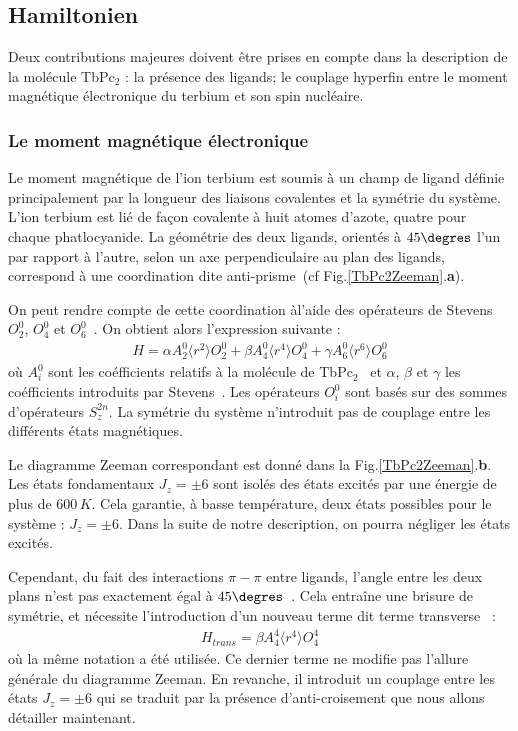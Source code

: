 \subsection{Hamiltonien}

Deux contributions majeures doivent être prises en compte dans la description de la molécule TbPc$_{2}$ : la présence des ligands; le couplage hyperfin entre le moment magnétique électronique du terbium et son spin nucléaire.

\subsubsection{Le moment magnétique électronique}
Le moment magnétique de l'ion terbium est soumis à un champ de ligand définie principalement par la longueur des liaisons covalentes et la symétrie du système. 
L'ion terbium est lié de façon covalente à huit atomes d'azote, quatre pour chaque phatlocyanide. La géométrie des deux ligands, orientés à $45\degres$ l'un par rapport à l'autre, selon un axe perpendiculaire au plan des ligands, correspond à une coordination dite anti-prisme~(cf Fig.\ref{TbPc2Zeeman}.\textbf{a}). 

On peut rendre compte de cette coordination àl'aide des opérateurs de Stevens $O_2^0$, $O_4^0$ et $O_6^0$~\cite{Stevens1952,Sorace2011}. On obtient alors l'expression suivante :
\begin{eqnarray}
H = \alpha A_2^0 \langle r^2 \rangle O_2^0 + \beta A_4^0 \langle r^4 \rangle O_4^0 + \gamma A_6^0 \langle r^6 \rangle O_6^0
\end{eqnarray}
où $A_i^0$ sont les coéfficients relatifs à la molécule de TbPc$_2$~\cite{Ishikawa2005} et $\alpha$, $\beta$ et $\gamma$ les coéfficients introduits par Stevens~\cite{Stevens1952}. Les opérateurs $O^0_i$ sont basés sur des sommes d'opérateurs $S_z^{2n}$. La symétrie du système n'introduit pas de couplage entre les différents états magnétiques. 

Le diagramme Zeeman correspondant est donné dans la Fig.\ref{TbPc2Zeeman}.\textbf{b}. Les états fondamentaux $J_z = \pm 6$ sont isolés des états excités par une énergie de plus de $600\,K$. Cela garantie, à basse température, deux états possibles pour le système : $J_z = \pm 6$. Dans la suite de notre description, on pourra négliger les états excités.

 
Cependant, du fait des interactions $\pi - \pi$ entre ligands, l'angle entre les deux plans n'est pas exactement égal à $45\degres$~\cite{Koike1996}. Cela entraîne une brisure de symétrie, et nécessite l'introduction d'un nouveau terme dit terme transverse~\cite{Sorace2011} :
\begin{eqnarray}
H_{trans} = \beta A_4^4 \langle r^4 \rangle O_4^4
\end{eqnarray}
où la m\^eme notation a été utilisée. Ce dernier terme ne modifie pas l'allure générale du diagramme Zeeman. En revanche, il introduit un couplage entre les états  $J_z = \pm 6$ qui se traduit par la présence d'anti-croisement que nous allons détailler maintenant.

